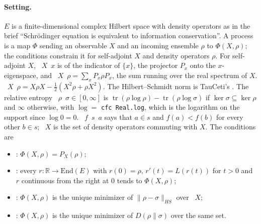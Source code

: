 \documentclass[11pt]{article}
\begin{document}
\paragraph{Setting.} $E$ is a finite-dimensional complex Hilbert space with density operators as
in the brief ``Schr\"odinger equation is equivalent to information conservation''. A process is a
map $\Phi$ sending an observable $X$ and an incoming ensemble $\rho$ to $\Phi(X, \rho)$; the
conditions constrain it for self-adjoint $X$ and density operators $\rho$. For self-adjoint $X$,
~$X$~$x$ is  of the indicator of $\{x\}$, the projector $P_x$ onto
the $x$-eigenspace, and ~$X$~$\rho = \sum_x P_x\rho P_x$, the sum running over the
real spectrum of $X$. ~$X$~$\rho = X\rho X - \tfrac12(X^2\rho +
\rho X^2)$. The Hilbert--Schmidt norm is TauCeti's . The relative entropy
~$\rho$~$\sigma \in [0, \infty]$ is
$\operatorname{tr}(\rho\log\rho) - \operatorname{tr}(\rho\log\sigma)$ if
$\ker\sigma \subseteq \ker\rho$ and $\infty$ otherwise, with $\log = $ \texttt{cfc Real.log}, which
is the logarithm on the support since $\log 0 = 0$. ~$f$~$s$~$a$ says that $a
\in s$ and $f(a) < f(b)$ for every other $b \in s$; ~$X$ is the set of
density operators commuting with $X$. The conditions are
\begin{itemize}
\item {}: $\Phi(X, \rho) = P_X(\rho)$;
\item {}: every $r : \mathbb{R} \to \mathrm{End}(E)$ with $r(0) = \rho$,
  $r'(t) = L(r(t))$ for $t > 0$ and $r$ continuous from the right at $0$ tends to
  $\Phi(X, \rho)$;
\item {}: $\Phi(X, \rho)$ is the unique minimizer of $\|\rho - \sigma\|_{HS}$ over
  ~$X$;
\item {}: $\Phi(X, \rho)$ is the unique minimizer of $D(\rho\|\sigma)$ over the same
  set.
\end{itemize}
\end{document}
